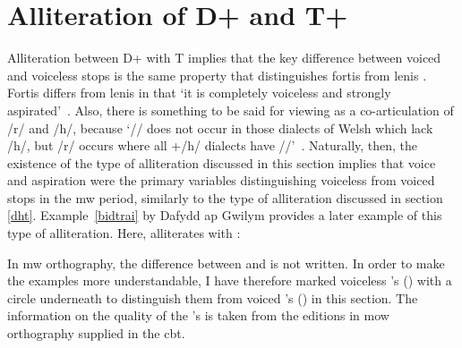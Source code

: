 \section{Alliteration of \gls{D}+ and \gls{T}+}
\label{drhtr}
Alliteration between \gls{D}+ with \gls{T} implies that the key difference between voiced and voiceless stops is the same property that distinguishes fortis  from lenis . Fortis  differs from lenis  in that `it is completely voiceless and strongly aspirated'~\autocite[50]{jones_distinctive_1984}. Also, there is something to be said for viewing  as a co-articulation of /r/ and /h/, because `/\rh/ does not occur in those dialects of Welsh which lack /h/, but /r/ occurs where all +/h/ dialects have /\rh/'~\autocite[50]{jones_distinctive_1984}. Naturally, then, the existence of the type of alliteration discussed in this section implies that voice and aspiration were the primary variables distinguishing voiceless from voiced stops in the \gls{mw} period, similarly to the type of alliteration discussed in section \ref{dht}. Example~\ref{bidtrai} by Dafydd ap Gwilym provides a later example of this type of alliteration. Here,  alliterates with :

In \gls{mw} orthography, the difference between  and  is not written. In order to make the examples more understandable, I have therefore marked voiceless \mw{\rh}'s () with a circle underneath to distinguish them from voiced 's () in this section. The information on the quality of the 's is taken from the editions in \gls{mow} orthography supplied in the \gls{cbt}.

